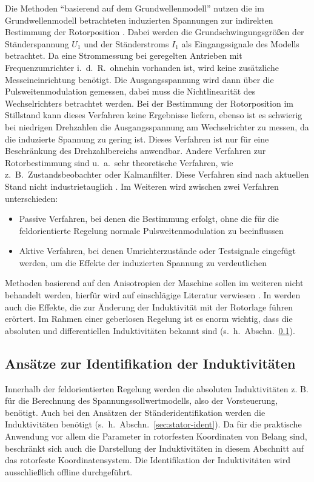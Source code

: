 \documentclass[conference,twocolumn]{IEEEtran}
\newcommand{\x}[1]{\mathrm{#1}}
\begin{document}
Die Methoden \enquote{basierend auf dem Grundwellenmodell} nutzen die im Grundwellenmodell betrachteten induzierten Spannungen zur indirekten Bestimmung der Rotorposition \autocite{Perassi2006}.
Dabei werden die Grundschwingungsgrößen der Ständerspannung $U_\x{1}$ und der Ständerstroms $I_\x{1}$ als Eingangssignale des Modells betrachtet.
Da eine Strommessung bei geregelten Antrieben mit Frequenzumrichter i.\ d.\ R.\ ohnehin vorhanden ist, wird keine zusätzliche Messeineinrichtung benötigt.
Die Ausgangsspannung wird dann über die Pulsweitenmodulation gemessen, dabei muss die Nichtlinearität des Wechselrichters betrachtet werden.
Bei der Bestimmung der Rotorposition im Stillstand kann dieses Verfahren keine Ergebnisse liefern, ebenso ist es schwierig bei niedrigen Drehzahlen die Ausgangsspannung am Wechselrichter zu messen, da die induzierte Spannung zu gering ist.
Dieses Verfahren ist nur für eine Beschränkung des Drehzahlbereichs anwendbar.
Andere Verfahren zur Rotorbestimmung sind u.\ a.\ sehr theoretische Verfahren, wie z.\ B.\ Zustandsbeobachter oder Kalmanfilter.
Diese Verfahren sind nach aktuellen Stand nicht industrietauglich \autocite{Kellner2012}.
Im Weiteren wird zwischen zwei Verfahren unterschieden:

\begin{itemize}
\item Passive Verfahren, bei denen die Bestimmung erfolgt, ohne die für die feldorientierte Regelung normale Pulsweitenmodulation zu beeinflussen
\item Aktive Verfahren, bei denen Umrichterzustände oder Testsignale eingefügt werden, um die Effekte der induzierten Spannung zu verdeutlichen
\end{itemize}

Methoden basierend auf den Anisotropien der Maschine sollen im weiteren nicht behandelt werden, hierfür wird auf einschlägige Literatur verwiesen \autocites{Perassi2006}{kiel2005}.
In \textcite{kiel2005} werden auch die Effekte, die zur Änderung der Induktivität mit der Rotorlage führen erörtert.
Im Rahmen einer geberlosen Regelung ist es enorm wichtig, dass die absoluten und differentiellen Induktivitäten bekannt sind (s.~h.~Abschn.~\ref{sec:induktiv}).

\subsection{Ansätze zur Identifikation der Induktivitäten}\label{sec:induktiv}

Innerhalb der feldorientierten Regelung werden die absoluten Induktivitäten z. B. für die Berechnung des Spannungssollwertmodells, also der Vorsteuerung, benötigt.
Auch bei den Ansätzen der Ständeridentifikation werden die Induktivitäten benötigt (s.~h.~Abschn.~\ref{sec:stator-ident}).
Da für die praktische Anwendung vor allem die Parameter in rotorfesten Koordinaten von Belang sind, beschränkt sich auch die Darstellung der Induktivitäten in diesem Abschnitt auf das rotorfeste Koordinatensystem.
Die Identifikation der Induktivitäten wird ausschließlich offline durchgeführt.
\end{document}
